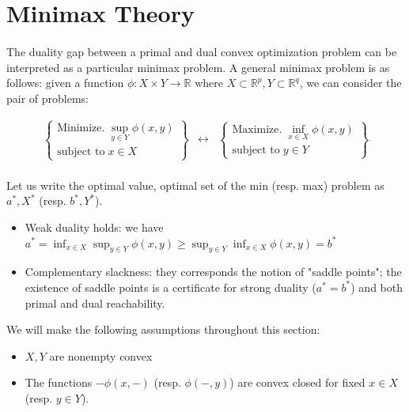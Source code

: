 \section{Minimax Theory}
\label{sect:047}

\paragraph{}The duality gap between a primal and dual convex optimization problem can be interpreted as a particular minimax problem. A general minimax problem is as follows: given a function $\phi:X\times Y\to \mathbb{R}$  where $X\subset \mathbb{R}^p,Y\subset \mathbb{R}^q$, we can consider the pair of problems:

\[
	\begin{matrix}
		\begin{Bmatrix}
			\text{Minimize.}\; \sup_{y\in Y}\phi(x,y) \\
			\text{subject to}\;  x\in X
		\end{Bmatrix} & \leftrightarrow &
		\begin{Bmatrix}
			\text{Maximize.}\;    \inf_{x\in X }\phi(x, y) \\
			\text{subject to}\;    y\in Y
		\end{Bmatrix}
	\end{matrix}
\]

\paragraph{}Let us write the optimal value, optimal set of the min (resp. max) problem as $a^\ast,X^\ast$ (resp. $b^\ast,Y^\ast$).

\begin{itemize}
	\item Weak duality holds: we have $a^\ast = \inf_{x\in X}\sup_{y\in Y}\phi(x,y)\geq \sup_{y\in Y}\inf_{x\in X}\phi(x,y)=b^\ast$
	\item Complementary slackness: they corresponds the notion of "saddle points"; the existence of saddle points is a certificate for strong duality ($a^\ast = b^\ast$) and both primal and dual reachability.
\end{itemize}

\begin{asmp}
	We will make the following assumptions throughout this section:
	\begin{itemize}
		\item $X,Y$ are nonempty convex
		\item The functions $-\phi(x,-)$ (resp. $\phi(-,y)$) are convex closed for fixed $x\in X$ (resp. $y\in Y$).
	\end{itemize}
\end{asmp}

